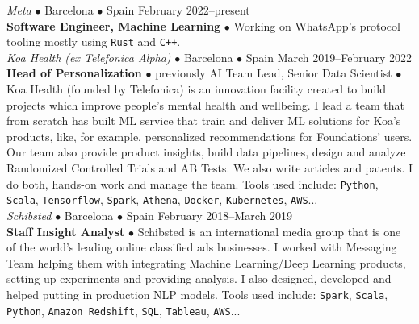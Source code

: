 \documentclass[a4paper, oneside]{scrreprt}
\begin{document}
\noindent{}
\hspace{-0.15cm}\textit{Meta} $\bullet$ 
Barcelona $\bullet$ Spain \hfill February 2022--present\\
\noindent\textbf{\small Software Engineer, Machine Learning } $\bullet$ 
{\small Working on WhatsApp's protocol tooling mostly using \texttt{Rust} and
  \texttt{C++}.}\\

\vspace{-0.3cm}
\noindent{}
\hspace{-0.2cm}\textit{Koa Health (ex Telefonica Alpha)} $\bullet$
Barcelona $\bullet$ Spain \hfill March 2019--February 2022\\
\noindent\textbf{\small Head of Personalization} $\bullet$ {previously
  AI Team Lead, Senior Data Scientist} $\bullet$ {\small Koa Health
  (founded by Telefonica) is an innovation facility created to build
  projects which improve people's mental health and wellbeing.  I lead
  a team that from scratch has built ML service that train and deliver
  ML solutions for Koa's products, like, for example, personalized
  recommendations for Foundations' users. Our team also provide product
  insights, build data pipelines, design and analyze Randomized Controlled Trials and AB
  Tests. We also write articles and patents. I do both, hands-on
  work and manage the team.  Tools used include: \texttt{Python},
  \texttt{Scala}, \texttt{Tensorflow}, \texttt{Spark},
  \texttt{Athena}, \texttt{Docker}, \texttt{Kubernetes},
  \texttt{AWS}... }\\

\vspace{-0.3cm}
\noindent{}
\hspace{-0.15cm}\textit{Schibsted} $\bullet$ 
Barcelona $\bullet$ Spain \hfill February 2018--March 2019\\
\noindent\textbf{\small Staff Insight Analyst } $\bullet$ 
{\small Schibsted is an international media group that is one of the world’s leading online
  classified ads businesses.  I worked with Messaging Team helping them with integrating Machine
  Learning/Deep Learning products, setting up experiments and providing analysis. I also designed,
  developed and helped putting in production NLP models. Tools used include: \texttt{Spark},
  \texttt{Scala}, \texttt{Python}, \texttt{Amazon Redshift}, \texttt{SQL}, \texttt{Tableau}, \texttt{AWS}... }\\
\end{document}
